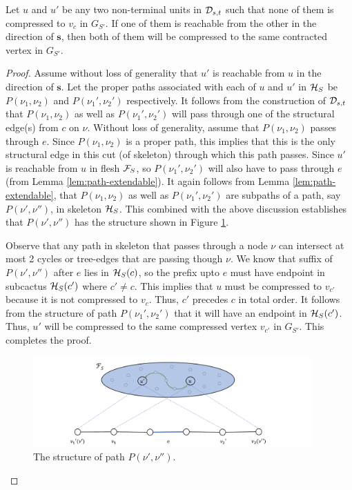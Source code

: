 \begin{lemma}
Let $u$ and $u'$ be any two non-terminal units in ${\cal D}_{s,t}$ such that none of them is compressed to $v_c$ in $G_{S'}$. If one of them is reachable from the other in the direction of ${\mathbf{s}}$, then both of them will be compressed to the same contracted vertex in $G_{S'}$.
%
\label{lem:u-u'-in-G-nu}
\end{lemma}
\begin{proof}
Assume without loss of generality that $u'$ is reachable from $u$ in the direction of ${\mathbf{s}}$.
Let the proper paths associated with each of $u$ and $u'$ in ${\cal H}_S$ be $P(\nu_1,\nu_2)$ and $P(\nu_1',\nu_2')$ respectively. 
It follows from the construction of ${\cal D}_{s,t}$ that
$P(\nu_1,\nu_2)$ as well as $P(\nu_1',\nu_2')$ will pass through one of the structural edge(s) from $c$ on $\nu$. Without loss of generality,  assume that $P(\nu_1,\nu_2)$ passes through $e$. Since $P(\nu_1,\nu_2)$ is a proper path, this implies that this is the only structural edge in this cut (of skeleton) through which this path passes.
Since $u'$ is reachable from $u$ in flesh ${\cal F}_S$, so $P(\nu_1',\nu_2')$ will also have to pass through $e$ (from Lemma \ref{lem:path-extendable}).
It again follows from Lemma \ref{lem:path-extendable}, that $P(\nu_1,\nu_2)$ as well as $P(\nu_1',\nu_2')$ are subpaths of a path, say $P(\nu',\nu'')$, in skeleton
${\cal H}_S$. This combined with the above discussion establishes that $P(\nu',\nu'')$ has the structure shown in Figure \ref{fig:structure-of-p(nu',nu'')}.

Observe that any path in skeleton that passes through a node $\nu$ can intersect at most 2 cycles or tree-edges that are passing though $\nu$. We know that suffix of $P(\nu',\nu'')$ after $e$ lies in ${\cal H}_S(c)$, so the prefix upto $e$ must have endpoint in subcactus ${\cal H}_S(c')$ where $c'\neq c$. This implies that $u$ must be compressed to $v_{c'}$ because it is not compressed to $v_c$. Thus, $c'$ precedes $c$ in total order. It follows from the structure of path $P(\nu_1',\nu_2')$ that it will have an endpoint in ${\cal H}_S(c')$. Thus, $u'$ will be compressed to the same compressed vertex $v_{c'}$ in $G_{S'}$. This completes the proof.

\begin{figure}%
\centering
\includegraphics[width=0.95\textwidth]{src/images/proof-reachability-compressed.pdf}
    \caption{The structure of path $P(\nu',\nu'')$.}
\label{fig:structure-of-p(nu',nu'')}
\end{figure}

\end{proof}

